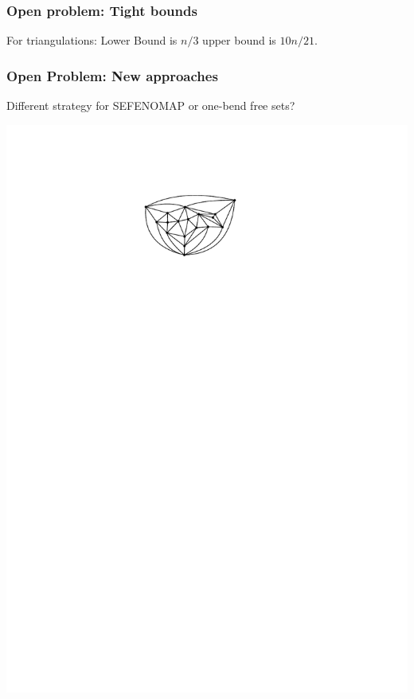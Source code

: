 \documentclass{beamer}
\begin{document}
\begin{frame}
  \frametitle{Open problem: Tight bounds}

  For triangulations: Lower Bound is $n/3$ upper bound is $10n/21$.
\end{frame}

\begin{frame}
  \frametitle{Open Problem: New approaches}

  Different strategy for SEFENOMAP or one-bend free sets?

  \begin{center}
    \includegraphics[page=13]{figs/walkthrough} \\

\end{center}
\end{frame}
\end{document}
